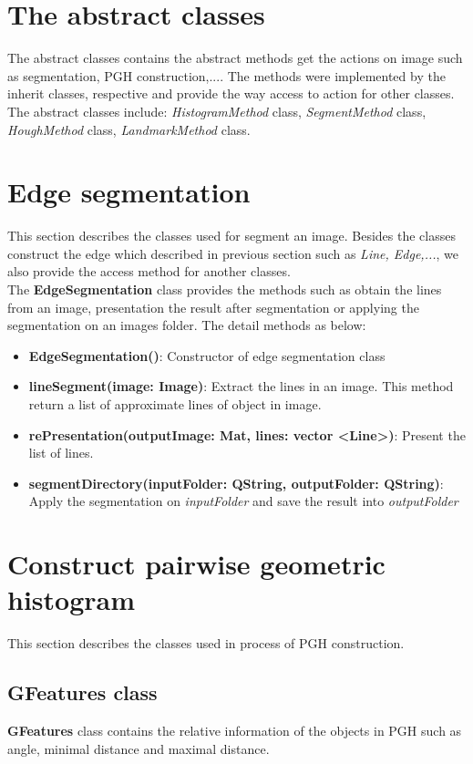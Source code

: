 \section{The abstract classes}
The abstract classes contains the abstract methods get the actions on image such as segmentation, PGH construction,.... The methods were implemented by the inherit classes, respective and provide the way access to action for other classes. The abstract classes include: \textit{HistogramMethod} class, \textit{SegmentMethod} class, \textit{HoughMethod} class, \textit{LandmarkMethod} class.
\section{Edge segmentation }
This section describes the classes used for segment an image. Besides the classes construct the edge which described in previous section such as \textit{Line, Edge,...}, we also provide the access method for another classes.\\[0.2cm]
The \textbf{EdgeSegmentation} class provides the methods such as obtain the lines from an image, presentation the result after segmentation or applying the segmentation on an images folder. The detail methods as below:
\begin{itemize}
\item\textbf{EdgeSegmentation()}: Constructor of edge segmentation class
\item\textbf{lineSegment(image: Image)}: Extract the lines in an image. This method return a list of approximate lines of object in image. 
\item\textbf{rePresentation(outputImage: Mat, lines: vector \textless Line\textgreater)}: Present the list of lines.
\item\textbf{segmentDirectory(inputFolder: QString, outputFolder: QString)}: Apply the segmentation on \textit{inputFolder} and save the result into \textit{outputFolder}
\end{itemize}
\section{Construct pairwise geometric histogram}
This section describes the classes used in process of PGH  construction.
\subsection{GFeatures class}
\textbf{GFeatures} class contains the relative information of the objects in PGH such as angle, minimal distance and maximal distance.
